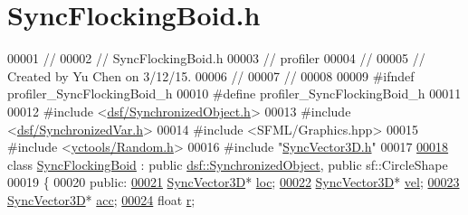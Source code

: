 \hypertarget{_sync_flocking_boid_8h_source}{}\section{Sync\+Flocking\+Boid.\+h}
\label{_sync_flocking_boid_8h_source}

\begin{DoxyCode}
00001 \textcolor{comment}{//}
00002 \textcolor{comment}{//  SyncFlockingBoid.h}
00003 \textcolor{comment}{//  profiler}
00004 \textcolor{comment}{//}
00005 \textcolor{comment}{//  Created by Yu Chen on 3/12/15.}
00006 \textcolor{comment}{//}
00007 \textcolor{comment}{//}
00008 
00009 \textcolor{preprocessor}{#ifndef profiler\_SyncFlockingBoid\_h}
00010 \textcolor{preprocessor}{#define profiler\_SyncFlockingBoid\_h}
00011 
00012 \textcolor{preprocessor}{#include <\hyperlink{_synchronized_object_8h}{dsf/SynchronizedObject.h}>}
00013 \textcolor{preprocessor}{#include <\hyperlink{_synchronized_var_8h}{dsf/SynchronizedVar.h}>}
00014 \textcolor{preprocessor}{#include <SFML/Graphics.hpp>}
00015 \textcolor{preprocessor}{#include <\hyperlink{_random_8h}{yctools/Random.h}>}
00016 \textcolor{preprocessor}{#include "\hyperlink{_sync_vector3_d_8h}{SyncVector3D.h}"}
00017 
\hypertarget{_sync_flocking_boid_8h_source_l00018}{}\hyperlink{class_sync_flocking_boid}{00018} \textcolor{keyword}{class }\hyperlink{class_sync_flocking_boid}{SyncFlockingBoid} : \textcolor{keyword}{public} \hyperlink{classdsf_1_1_synchronized_object}{dsf::SynchronizedObject}, \textcolor{keyword}{public} 
      sf::CircleShape
00019 \{
00020 \textcolor{keyword}{public}:
\hypertarget{_sync_flocking_boid_8h_source_l00021}{}\hyperlink{class_sync_flocking_boid_a1448999018acaa4ec3117ee2bbee2b02}{00021}     \hyperlink{class_sync_vector3_d}{SyncVector3D}* \hyperlink{class_sync_flocking_boid_a1448999018acaa4ec3117ee2bbee2b02}{loc};
\hypertarget{_sync_flocking_boid_8h_source_l00022}{}\hyperlink{class_sync_flocking_boid_a1b6cf043598e64ecd40ecd5b75beb01f}{00022}     \hyperlink{class_sync_vector3_d}{SyncVector3D}* \hyperlink{class_sync_flocking_boid_a1b6cf043598e64ecd40ecd5b75beb01f}{vel};
\hypertarget{_sync_flocking_boid_8h_source_l00023}{}\hyperlink{class_sync_flocking_boid_ac3bd9015e70a26d8a59d200563a5cf0e}{00023}     \hyperlink{class_sync_vector3_d}{SyncVector3D}* \hyperlink{class_sync_flocking_boid_ac3bd9015e70a26d8a59d200563a5cf0e}{acc};
\hypertarget{_sync_flocking_boid_8h_source_l00024}{}\hyperlink{class_sync_flocking_boid_ac4386412e74ca67214ad6e1c55eb1525}{00024}     \textcolor{keywordtype}{float} \hyperlink{class_sync_flocking_boid_ac4386412e74ca67214ad6e1c55eb1525}{r};

\end{DoxyCode}
